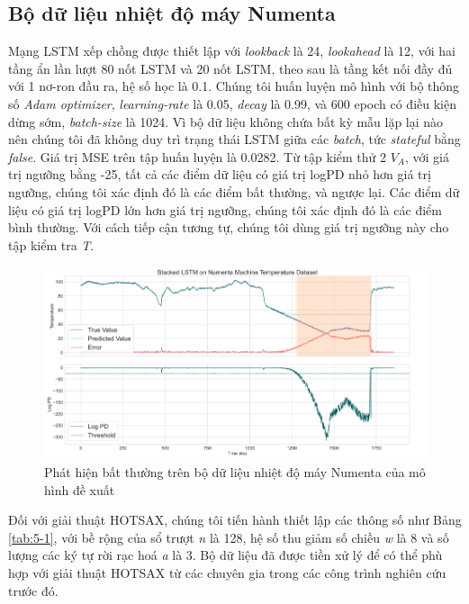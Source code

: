 \subsection{Bộ dữ liệu nhiệt độ máy Numenta}
Mạng LSTM xếp chồng được thiết lập với \textit{lookback} là 24, \textit{lookahead} là 12, với hai tầng ẩn lần lượt 80 nốt LSTM và 20 nốt LSTM, theo sau là tầng kết nối đầy đủ với 1 nơ-ron đầu ra, hệ số học là 0.1. Chúng tôi huấn luyện mô hình với bộ thông số \textit{Adam optimizer}, \textit{learning-rate} là 0.05, \textit{decay} là 0.99, và 600 epoch có điều kiện dừng sớm, \textit{batch-size} là 1024. Vì bộ dữ liệu không chứa bất kỳ mẫu lặp lại nào nên chúng tôi đã không duy trì trạng thái LSTM giữa các \textit{batch}, tức \textit{stateful} bằng \textit{false}. Giá trị MSE trên tập huấn luyện là 0.0282. Từ tập kiểm thử 2 $V_{A}$, với giá trị ngưỡng bằng -25, tất cả các điểm dữ liệu có giá trị logPD nhỏ hơn giá trị ngưỡng, chúng tôi xác định đó là các điểm bất thường, và ngược lại. Các điểm dữ liệu có giá trị logPD lớn hơn giá trị ngưỡng, chúng tôi xác định đó là các điểm bình thường. Với cách tiếp cận tương tự, chúng tôi dùng giá trị ngưỡng này cho tập kiểm tra \textit{T}.

\begin{figure}[H]
    \centering
    \includegraphics[scale=1.1]{./content/images/5-3.png}
    \caption{Phát hiện bất thường trên bộ dữ liệu nhiệt độ máy Numenta của mô hình đề xuất}
    \label{fig:5-3}
\end{figure}

Đối với giải thuật HOTSAX, chúng tôi tiến hành thiết lập các thông số như Bảng \ref{tab:5-1}, với bề rộng của sổ trượt \textit{n} là 128, hệ số thu giảm số chiều \textit{w} là 8 và số lượng các ký tự rời rạc hoá \textit{a} là 3. Bộ dữ liệu đã được tiền xử lý để có thể phù hợp với giải thuật HOTSAX từ các chuyên gia trong các công trình nghiên cứu trước đó.

